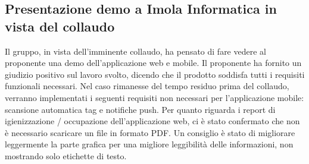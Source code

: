 \subsection*{Presentazione demo a Imola Informatica in vista del collaudo}
Il gruppo, in vista dell'imminente collaudo, ha pensato di fare vedere al proponente una demo dell'applicazione web e mobile.
Il proponente ha fornito un giudizio positivo sul lavoro svolto, dicendo che il prodotto soddisfa tutti i requisiti funzionali necessari. 
Nel caso rimanesse del tempo residuo prima del collaudo, verranno implementati i seguenti requisiti non necessari per l'applicazione mobile: scansione automatica tag e notifiche push.
Per quanto riguarda i report di igienizzazione / occupazione dell'applicazione web, ci è stato confermato che non è necessario scaricare un file in formato PDF.
Un consiglio è stato di migliorare leggermente la parte grafica per una migliore leggibilità delle informazioni, non mostrando solo etichette di testo.






